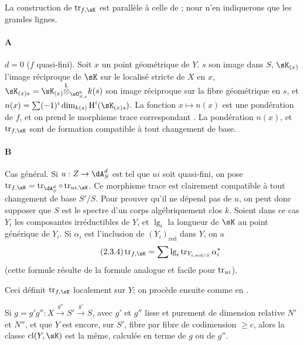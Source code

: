 \subsubsection{}\label{IV:2-3-4}

La construction de $\tr_{f,\sK}$ est parallèle à celle de 
\cite[XVIII.2]{sga4}; nour n'en indiquerons que les grandes lignes.

\paragraph{A}
$d=0$ ($f$ quasi-fini). Soit $x$ un point géométrique de $Y$. $s$ son image 
dans $S$, $\sK_{(x)}$ l'image réciproque de $\sK$ sur le localisé stricte 
de $X$ en $x$, $\sK_{(x)s} = \sK_{(x)}\lotimes_{\sO_{S,s}^h} k(s)$ son image 
réciproque sur la fibre géométrique en $s$, et 
$n(x)=\sum (-1)^i \dim_{k(s)} \h^i(\sK_{(x)s})$. La fonction $x\mapsto n(x)$ 
est une pondération de $f$, et on prend le morphisme trace correspondant 
\cite[XVII.6.2.5]{sga4}. La pondération $n(x)$, et $\tr_{f,\sK}$ sont de 
formation compatible à tout changement de base. 

\paragraph{B}
Cas général. Si $u:Z\to \dA_S^d$ est tel que $u i$ soit quasi-fini, on pose 
$\tr_{f,\sK} = \tr_{\dA_S^d}\circ \tr_{u i,\sK}$. Ce morphisme trace est 
clairement compatible à tout changement de base $S'/S$. Pour prouver qu'il ne 
dépend pas de $u$, on peut donc supposer que $S$ est le spectre d'un corps 
algébriquement clos $k$. Soient dans ce cas $Y_i$ les composantes 
irréductibles de $Y$, et $\operatorname{lg}_i$ la longueur de $\sK$ au 
point générique de $Y_i$. Si $\alpha_i$ est l'inclusion de 
$(Y_i)_\text{red}$ dans $Y$, on a 
\begin{equation*}\tag{2.3.4}\label{IV:eq:2-3-4}
  \tr_{f,\sK} = \sum \operatorname{lg}_i \tr_{Y_{i,\text{red}/S}} \alpha_i^\ast
\end{equation*}
(cette formule résulte de la formule analogue et facile pour $\operatorname{tr}_{u i}$). 

Ceci définit $\tr_{f,\sK}$ localement sur $Y$; on procède ensuite comme en 
\cite[XVIII.2.9]{sga4}. 





\begin{lemma}\label{IV:2-3-5}
Si $g=g'g'':X\xrightarrow{g''} S'\xrightarrow{g'} S$, avec $g'$ et $g''$ lisse 
et purement de dimension relative $N'$ et $N''$, et que $Y$ est encore, sur 
$S'$, fibre par fibre de codimension $\geqslant c$, alors la classe 
$\operatorname{cl}(Y,\sK)$ est la même, calculée en terme de $g$ ou de 
$g''$.
\end{lemma}


